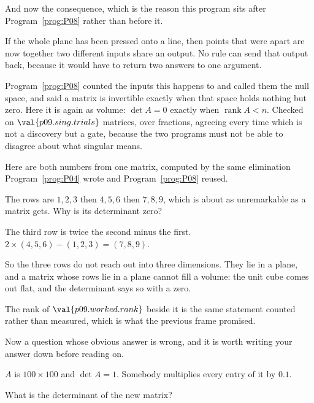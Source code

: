 \begin{fr}
And now the consequence, which is the reason this program sits after
Program~\ref{prog:P08} rather than before it.

If the whole plane has been pressed onto a line, then points that were apart
are now together \dash{} two different inputs share an output. No rule can send
that output back, because it would have to return two answers to one argument.

Program~\ref{prog:P08} counted the inputs this happens to and called them the
null space, and said a matrix is invertible exactly when that space holds
nothing but zero. Here it is again as volume: $\det A = 0$ exactly when
$\operatorname{rank} A < n$. Checked on $\val{p09.sing.trials}$ matrices, over
fractions, agreeing every time \dash{} which is not a discovery but a gate,
because the two programs must not be able to disagree about what singular
means.
\end{fr}

\begin{fr}
Here are both numbers from one matrix, computed by the same elimination
Program~\ref{prog:P04} wrote and Program~\ref{prog:P08} reused.


The rows are $1, 2, 3$ then $4, 5, 6$ then $7, 8, 9$, which is about as
unremarkable as a matrix gets. Why is its determinant zero?
\dotline
\nextframe
\end{fr}

\begin{fr}
\begin{ansblock}
The third row is twice the second minus the first. $2 \times (4,5,6) - (1,2,3)
= (7,8,9)$.
\end{ansblock}

So the three rows do not reach out into three dimensions. They lie in a plane,
and a matrix whose rows lie in a plane cannot fill a volume: the unit cube comes
out flat, and the determinant says so with a zero.

The rank of $\val{p09.worked.rank}$ beside it is the same statement counted
rather than measured, which is what the previous frame promised.
\end{fr}


\begin{fr}
Now a question whose obvious answer is wrong, and it is worth writing your
answer down before reading on.

$A$ is $100 \times 100$ and $\det A = 1$. Somebody multiplies every entry of it
by $\num{0.1}$.

What is the determinant of the new matrix?
\dotline
\nextframe
\end{fr}


